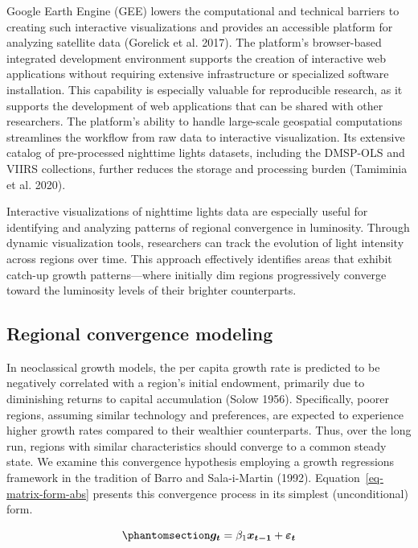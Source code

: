 \documentclass[
  letterpaper,
  DIV=11,
  numbers=noendperiod]{scrartcl}
\begin{document}
Google Earth Engine (GEE) lowers the computational and technical
barriers to creating such interactive visualizations and provides an
accessible platform for analyzing satellite data (Gorelick et al. 2017).
The platform's browser-based integrated development environment supports
the creation of interactive web applications without requiring extensive
infrastructure or specialized software installation. This capability is
especially valuable for reproducible research, as it supports the
development of web applications that can be shared with other
researchers. The platform's ability to handle large-scale geospatial
computations streamlines the workflow from raw data to interactive
visualization. Its extensive catalog of pre-processed nighttime lights
datasets, including the DMSP-OLS and VIIRS collections, further reduces
the storage and processing burden (Tamiminia et al. 2020).

Interactive visualizations of nighttime lights data are especially
useful for identifying and analyzing patterns of regional convergence in
luminosity. Through dynamic visualization tools, researchers can track
the evolution of light intensity across regions over time. This approach
effectively identifies areas that exhibit catch-up growth
patterns---where initially dim regions progressively converge toward the
luminosity levels of their brighter counterparts.

\subsection{Regional convergence
modeling}\label{regional-convergence-modeling}

In neoclassical growth models, the per capita growth rate is predicted
to be negatively correlated with a region's initial endowment, primarily
due to diminishing returns to capital accumulation (Solow 1956).
Specifically, poorer regions, assuming similar technology and
preferences, are expected to experience higher growth rates compared to
their wealthier counterparts. Thus, over the long run, regions with
similar characteristics should converge to a common steady state. We
examine this convergence hypothesis employing a growth regressions
framework in the tradition of Barro and Sala-i-Martin (1992).
Equation~\ref{eq-matrix-form-abs} presents this convergence process in
its simplest (unconditional) form.

\begin{equation}\phantomsection\label{eq-matrix-form-abs}{
\boldsymbol{g_t} =  \beta_1 \boldsymbol{x_{t-1}} +  \boldsymbol{\varepsilon_t}
}\end{equation}
\end{document}
